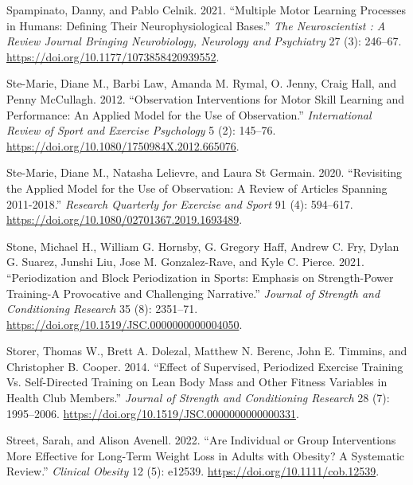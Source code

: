 \documentclass[
  letterpaper,
  DIV=11,
  numbers=noendperiod]{scrreprt}
\newlength{\cslhangindent}
\newenvironment{CSLReferences}[2] %
 {\begin{list}{}{%
  \setlength{\itemindent}{0pt}
  \setlength{\leftmargin}{0pt}
  \setlength{\parsep}{0pt}
  \ifodd #1
   \setlength{\leftmargin}{\cslhangindent}
   \setlength{\itemindent}{-1\cslhangindent}
  \fi
  \setlength{\itemsep}{#2\baselineskip}}}
 {\end{list}}
\begin{document}
\begin{CSLReferences}{1}{0}
Spampinato, Danny, and Pablo Celnik. 2021. {``Multiple {Motor Learning
Processes} in {Humans}: {Defining Their Neurophysiological Bases}.''}
\emph{The Neuroscientist : A Review Journal Bringing Neurobiology,
Neurology and Psychiatry} 27 (3): 246--67.
\url{https://doi.org/10.1177/1073858420939552}.

Ste-Marie, Diane M., Barbi Law, Amanda M. Rymal, O. Jenny, Craig Hall,
and Penny McCullagh. 2012. {``Observation Interventions for Motor Skill
Learning and Performance: An Applied Model for the Use of
Observation.''} \emph{International Review of Sport and Exercise
Psychology} 5 (2): 145--76.
\url{https://doi.org/10.1080/1750984X.2012.665076}.

Ste-Marie, Diane M., Natasha Lelievre, and Laura St Germain. 2020.
{``Revisiting the {Applied Model} for the {Use} of {Observation}: {A
Review} of {Articles Spanning} 2011-2018.''} \emph{Research Quarterly
for Exercise and Sport} 91 (4): 594--617.
\url{https://doi.org/10.1080/02701367.2019.1693489}.

Stone, Michael H., William G. Hornsby, G. Gregory Haff, Andrew C. Fry,
Dylan G. Suarez, Junshi Liu, Jose M. Gonzalez-Rave, and Kyle C. Pierce.
2021. {``Periodization and {Block Periodization} in {Sports}: {Emphasis}
on {Strength-Power Training-A Provocative} and {Challenging
Narrative}.''} \emph{Journal of Strength and Conditioning Research} 35
(8): 2351--71. \url{https://doi.org/10.1519/JSC.0000000000004050}.

Storer, Thomas W., Brett A. Dolezal, Matthew N. Berenc, John E. Timmins,
and Christopher B. Cooper. 2014. {``Effect of Supervised, Periodized
Exercise Training Vs. Self-Directed Training on Lean Body Mass and Other
Fitness Variables in Health Club Members.''} \emph{Journal of Strength
and Conditioning Research} 28 (7): 1995--2006.
\url{https://doi.org/10.1519/JSC.0000000000000331}.

Street, Sarah, and Alison Avenell. 2022. {``Are Individual or Group
Interventions More Effective for Long-Term Weight Loss in Adults with
Obesity? {A} Systematic Review.''} \emph{Clinical Obesity} 12 (5):
e12539. \url{https://doi.org/10.1111/cob.12539}.


\end{CSLReferences}
\end{document}
